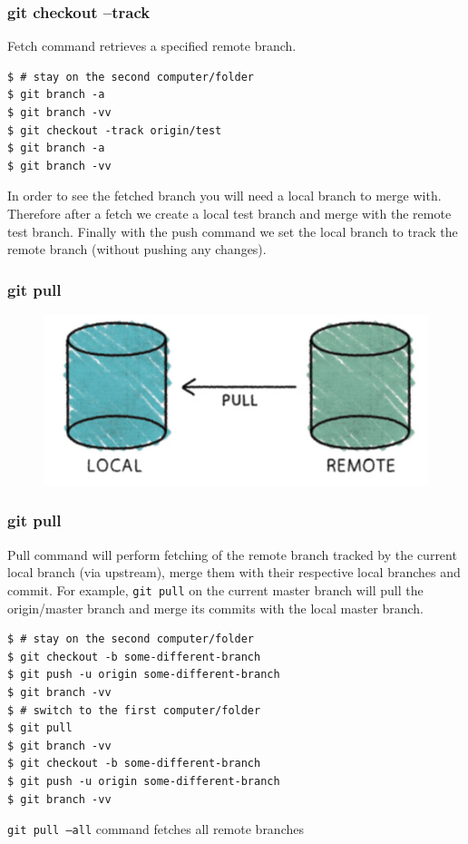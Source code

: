 \documentclass{beamer}
\begin{document}
\begin{frame}[fragile]
\frametitle{git checkout --track}

Fetch command retrieves a specified remote branch.

\begin{lstlisting}
$ # stay on the second computer/folder
$ git branch -a
$ git branch -vv
$ git checkout -track origin/test
$ git branch -a
$ git branch -vv
\end{lstlisting}

In order to see the fetched branch you will need a local branch to
merge with. Therefore after a fetch we create a local test branch and
merge with the remote test branch. Finally with the push command we
set the local branch to track the remote branch (without pushing any
changes).


\end{frame}


\begin{frame}[fragile]
\frametitle{git pull}
\begin{figure}

  \includegraphics[scale=0.3]{figures/f7.png}
\end{figure}
\end{frame}

\begin{frame}[fragile]
\frametitle{git pull}

Pull command will perform fetching of the remote branch tracked by the
current local branch (via upstream), merge them with their
respective local branches and commit.
For example, \texttt{git pull} on the current master branch will pull
the origin/master branch and merge its commits with the local master branch.
\begin{lstlisting}
$ # stay on the second computer/folder
$ git checkout -b some-different-branch
$ git push -u origin some-different-branch
$ git branch -vv
$ # switch to the first computer/folder
$ git pull
$ git branch -vv
$ git checkout -b some-different-branch
$ git push -u origin some-different-branch
$ git branch -vv
\end{lstlisting}

\texttt{git pull ---all} command fetches all remote branches

\end{frame}
\end{document}
